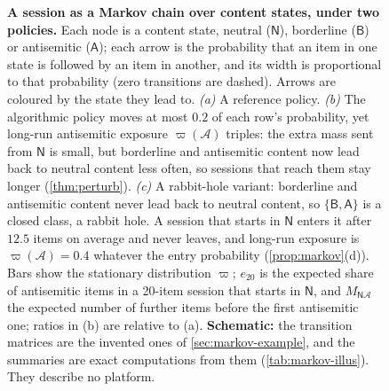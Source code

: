 \begin{figure}[t]
\caption{\textbf{A session as a Markov chain over content states, under two
policies.} Each node is a content state, neutral ($\mathsf N$), borderline ($\mathsf B$) or
antisemitic ($\mathsf A$); each arrow is the probability that an item in one state is
followed by an item in another, and its width is proportional to that
probability (zero transitions are dashed). Arrows are coloured by the state
they lead to. \emph{(a)} A reference policy. \emph{(b)} The algorithmic policy
moves at most $0.2$ of each row's probability, yet long-run antisemitic
exposure $\varpi(\mathcal A)$ triples: the extra mass sent from $\mathsf N$ is small,
but borderline and antisemitic content now lead back to neutral content less
often, so sessions that reach them stay longer (\cref{thm:perturb}).
\emph{(c)} A rabbit-hole variant: borderline and antisemitic content never lead
back to neutral content, so $\{\mathsf B,\mathsf A\}$ is a closed class, a rabbit hole. A
session that starts in $\mathsf N$ enters it after $12.5$ items on average and never
leaves, and long-run exposure is $\varpi(\mathcal A)=0.4$ whatever the entry
probability (\cref{prop:markov}(d)). Bars show the stationary
distribution $\varpi$; $e_{20}$ is the expected share of antisemitic items in a
20-item session that starts in $\mathsf N$, and $M_{\mathsf N\mathcal A}$ the expected number
of further items before the first antisemitic one; ratios in (b) are relative
to (a). \textbf{Schematic:} the transition matrices are the invented ones of
\cref{sec:markov-example}, and the summaries are exact computations from them
(\cref{tab:markov-illus}). They describe no platform.}
\label{fig:markov}
\end{figure}
